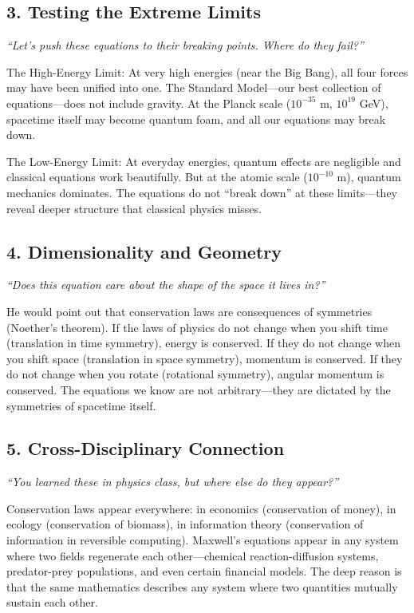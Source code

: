 \subsection*{3. Testing the Extreme Limits}
\textit{``Let's push these equations to their breaking points. Where do they fail?''}

The High-Energy Limit: At very high energies (near the Big Bang), all four forces may have been unified into one. The Standard Model---our best collection of equations---does not include gravity. At the Planck scale ($10^{-35}$ m, $10^{19}$ GeV), spacetime itself may become quantum foam, and all our equations may break down.

The Low-Energy Limit: At everyday energies, quantum effects are negligible and classical equations work beautifully. But at the atomic scale ($10^{-10}$ m), quantum mechanics dominates. The equations do not ``break down'' at these limits---they reveal deeper structure that classical physics misses.

\subsection*{4. Dimensionality and Geometry}
\textit{``Does this equation care about the shape of the space it lives in?''}

He would point out that conservation laws are consequences of symmetries (Noether's theorem). If the laws of physics do not change when you shift time (translation in time symmetry), energy is conserved. If they do not change when you shift space (translation in space symmetry), momentum is conserved. If they do not change when you rotate (rotational symmetry), angular momentum is conserved. The equations we know are not arbitrary---they are dictated by the symmetries of spacetime itself.

\subsection*{5. Cross-Disciplinary Connection}
\textit{``You learned these in physics class, but where else do they appear?''}

Conservation laws appear everywhere: in economics (conservation of money), in ecology (conservation of biomass), in information theory (conservation of information in reversible computing). Maxwell's equations appear in any system where two fields regenerate each other---chemical reaction-diffusion systems, predator-prey populations, and even certain financial models. The deep reason is that the same mathematics describes any system where two quantities mutually sustain each other.


